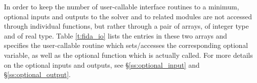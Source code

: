 In order to keep the number of user-callable {\fida} interface routines to
a minimum, optional inputs and outputs to the {\ida} solver and to related 
modules are not accessed through individual functions, but rather through a
pair of arrays,  of integer type and  of real type.
Table \ref{t:fida_io} lists the entries in these two arrays and specifies the
{\fida} user-callable routine which sets/accesses the corresponding optional
variable, as well as the {\ida} optional function which is actually called.
For more details on the optional inputs and outputs, see \S\ref{ss:optional_input}
and \S\ref{ss:optional_output}.

\label{t:fida_io}
\tablelasttail{\hline}
